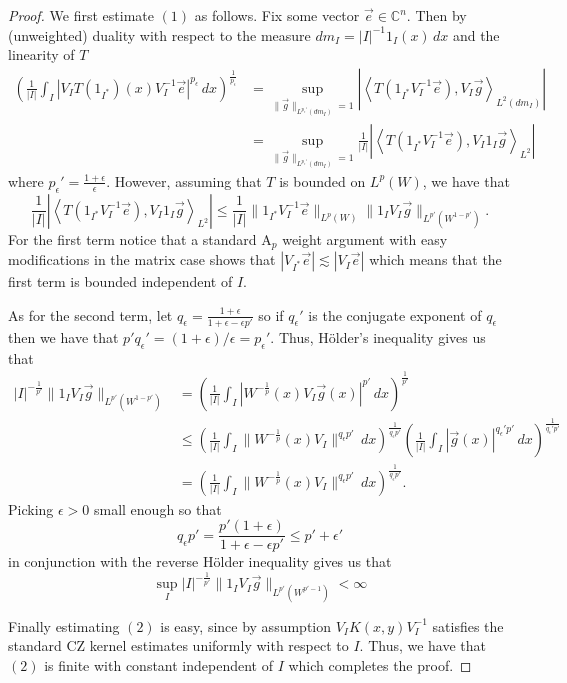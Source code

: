\documentclass[12pt,reqno ]{amsart}
\numberwithin{equation}{section}
\theoremstyle{definition}
\newcommand{\abs}[1]{|#1|}
\newcommand{\C}{\ensuremath{\mathbb{C}^n}}
\newcommand{\ip}[2]{\ensuremath{\left\langle#1,#2\right\rangle}}
\begin{document}
\begin{proof}
We first estimate $(1)$ as follows. Fix some vector $\vec{e} \in \C$.  Then by (unweighted) duality with respect to the measure $dm_I = |I|^{-1} 1_I (x) \, dx$ and the linearity of $T$ \begin{align*}   \left(\frac{1}{|I|} \int_I  \abs{V_I T(1_{I^*}) (x) V_I ^{-1} \vec{e} } ^{p_\epsilon}  \, dx\right)^\frac{1}{p_\epsilon} & =  \sup_{\|\vec{g}\|_{L^{p_\epsilon ' }(dm_I)} = 1} \abs{\ip{  T(1_{I^*}V_I ^{-1} \vec{e} )}{ V_I  \vec{g}}_{L^2 (dm_I)}} \\ & = \sup_{\|\vec{g}\|_{L^{p_\epsilon '}(dm_I)} = 1} \frac{1}{|I|} \abs{\ip{  T(1_{I^*}V_I ^{-1} \vec{e} ) }{ V_I 1_I \vec{g}}_{L^2 }} \end{align*} where $p_\epsilon ' =  \frac{1 + \epsilon}{\epsilon}. $  However, assuming that $T$ is bounded on $L^p(W)$, we have that \begin{equation*} \frac{1}{|I|} \abs{ \ip{  T(1_{I^*}V_I ^{-1} \vec{e})  }{  V_I 1_I \vec{g} }_{L^2} } \leq  \frac{1}{|I|}\|1_{I^*} V_I ^{-1} \vec{e} \|_{L^p(W)} \|  1_I   V_I \vec{g} \|_{L^{p'} (W ^{1 - p'})}. \end{equation*} For the first term notice that a standard A${}_p$ weight argument with easy modifications in the matrix case shows that $|V_{I^*} \vec{e}| \lesssim |V_I \vec{e}|$ which means that the first term is bounded independent of $I$.

As for the second term, let $q_\epsilon = \frac{1 + \epsilon}{1 + \epsilon - \epsilon p'}$ so if $q_\epsilon '$ is the conjugate exponent of $q_\epsilon$ then we have that $p ' q_\epsilon ' = (1 + \epsilon)/\epsilon = p_\epsilon '$.  Thus, H\"{o}lder's inequality gives us that \begin{align*} |I| ^{-\frac{1}{p'}} \|  1_I   V_I \vec{g} \|_{L^{p'} (W ^{1 - p'})} & = \left( \frac{1}{|I|} \int_I |W^{-\frac{1}{p} } (x) V_I \vec{g} (x) |^{ p'} \, dx \right) ^\frac{1}{p'} \\ & \leq \left( \frac{1}{|I|} \int_I \|W^{-\frac{1}{p}} (x) V_I \| ^{q_\epsilon p'} \, dx \right)^\frac{1}{q_\epsilon p'} \left( \frac{1}{|I|} \int_I |\vec{g}(x)| ^{q_\epsilon ' p' } \, dx \right)^\frac{1}{q_\epsilon ' p ' } \\ & =  \left( \frac{1}{|I|} \int_I \|W^{-\frac{1}{p}} (x) V_I \| ^{q_\epsilon p'} \, dx \right)^\frac{1}{q_\epsilon p'}.\end{align*} Picking $\epsilon > 0$ small enough so that \begin{equation*} q_\epsilon p' = \frac{p'(1 + \epsilon)}{1 + \epsilon - \epsilon p'} \leq p' + \epsilon' \end{equation*} in conjunction with the reverse H\"{o}lder inequality gives us that
\begin{equation*} \sup_I |I| ^{-\frac{1}{p'}} \|  1_I   V_I \vec{g} \|_{L^{p'} (W ^{p' - 1})} < \infty \end{equation*}


 Finally estimating $(2)$ is easy, since by assumption $V_I K(x, y) V_I ^{-1}$ satisfies the standard CZ kernel estimates uniformly with respect to $I$.  Thus,  we have that $(2)$ is finite with constant independent of $I$ which completes the proof.

\end{proof}
\end{document}
